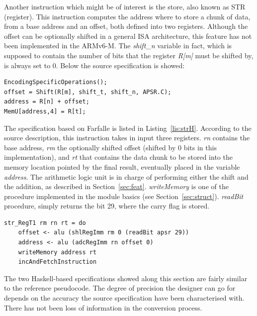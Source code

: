 \documentclass[conference]{IEEEtran}
\begin{document}
Another instruction which might be of interest is the store, also known as STR (register).
This instruction computes the address where to store a chunk of data, from a base
address and an offset, both defined into two registers. Although the offset can be optionally
shifted in a general ISA architecture, this feature has not been implemented in the ARMv6-M.
The \textit{shift\_n} variable in fact, which is supposed to contain the number of bits that
the register \textit{R[m]} must be shifted by, is always set to 0. Below the source
specification is showed:\\

\begin{lstlisting}[caption=STR (register) instruction - Reference specification,
frame=single, label=lis:str]
EncodingSpecificOperations();
offset = Shift(R[m], shift_t, shift_n, APSR.C);
address = R[n] + offset;
MemU[address,4] = R[t];
\end{lstlisting}

\noindent
The specification based on Farfalle is listed in Listing~\ref{lis:strH}.
According to the source description, this instruction takes in input three registers.
\textit{rn} contains the base address, \textit{rm} the optionally shifted offset (shifted by
0 bits in this implementation), and \textit{rt} that contains the data chunk to be stored
into the memory location pointed by the final result, eventually placed in the variable
\textit{address}. The arithmetic logic unit is in charge of performing either the shift and
the addition, as described in Section~\ref{sec:feat}. \textit{writeMemory} is one of the
procedure implemented in the module basics (see Section~\ref{sec:struct}). \textit{readBit}
procedure, simply returns the bit 29, where the carry flag is stored.\\

\begin{lstlisting}[caption=STR (register) instruction - Farfalle specification,
frame=single, label=lis:strH]
str_RegT1 rm rn rt = do
    offset <- alu (shlRegImm rm 0 (readBit apsr 29))
    address <- alu (adcRegImm rn offset 0)
    writeMemory address rt
    incAndFetchInstruction
\end{lstlisting}

The two Haskell-based specifications showed along this section are fairly similar to the
reference pseudocode. The degree of precision the designer can go for depends on the accuracy
the source specification have been characterised with. There has not been loss of
information in the conversion process.
\end{document}
